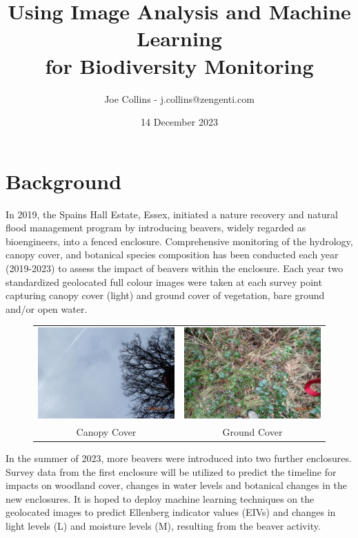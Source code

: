 \documentclass{./roles}
\title{Using Image Analysis and Machine Learning\\for Biodiversity Monitoring}
\author{Joe Collins - j.collins@zengenti.com}
\date{14 December 2023}
\begin{document}
\maketitle

\section*{Background}

In 2019, the Spains Hall Estate, Essex,
initiated a nature recovery and natural flood management program by introducing beavers, widely regarded as bioengineers,
into a fenced enclosure.
Comprehensive monitoring of the hydrology, canopy cover, and botanical species composition has been conducted
each year (2019-2023) to assess the impact of beavers within the enclosure.
Each year two standardized geolocated full colour images were taken at each survey point
capturing canopy cover (light) and ground cover of vegetation,
bare ground and/or open water.

\begin{figure}[H]
  \centering
  \begin{tabular}{cc}
    \includegraphics[width=0.45\linewidth]{../images/survey-up.jpg} &
    \includegraphics[width=0.45\linewidth]{../images/survey-down.jpg} \\
    Canopy Cover & Ground Cover \\
  \end{tabular}
\end{figure}

In the summer of 2023, more beavers were introduced into two further enclosures.
Survey data from the first enclosure will be utilized
to predict the timeline for impacts on woodland cover, changes in water levels and botanical changes in the new enclosures.
It is hoped to deploy machine learning techniques on the geolocated images
to predict Ellenberg indicator values (EIVs) and changes in light levels (L) and moisture levels (M), resulting from the beaver activity.
\end{document}
